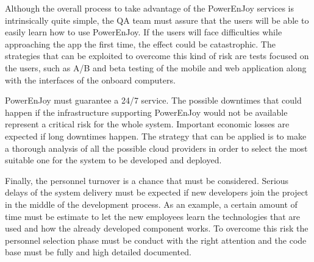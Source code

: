 Although the overall process to take advantage of the PowerEnJoy services is intrinsically quite simple, the QA team must assure that the users will be able to easily learn how to use PowerEnJoy. If the users will face difficulties while approaching the app the first time, the effect could be catastrophic. The strategies that can be exploited to overcome this kind of risk are tests focused on the users, such as A/B and beta testing of the mobile and web application along with the interfaces of the onboard computers.

PowerEnJoy must guarantee a 24/7 service. The possible downtimes that could happen if the infrastructure supporting PowerEnJoy would not be available represent a critical risk for the whole system. Important economic losses are expected if long downtimes happen. The strategy that can be applied is to make a thorough analysis of all the possible cloud providers in order to select the most suitable one for the system to be developed and deployed.

Finally, the personnel turnover is a chance that must be considered. Serious delays of the system delivery must be expected if new developers join the project in the middle of the development process. As an example, a certain amount of time must be estimate to let the new employees learn the technologies that are used and how the already developed component works. To overcome this risk the personnel selection phase must be conduct with the right attention and the code base must be fully and high detailed documented.
